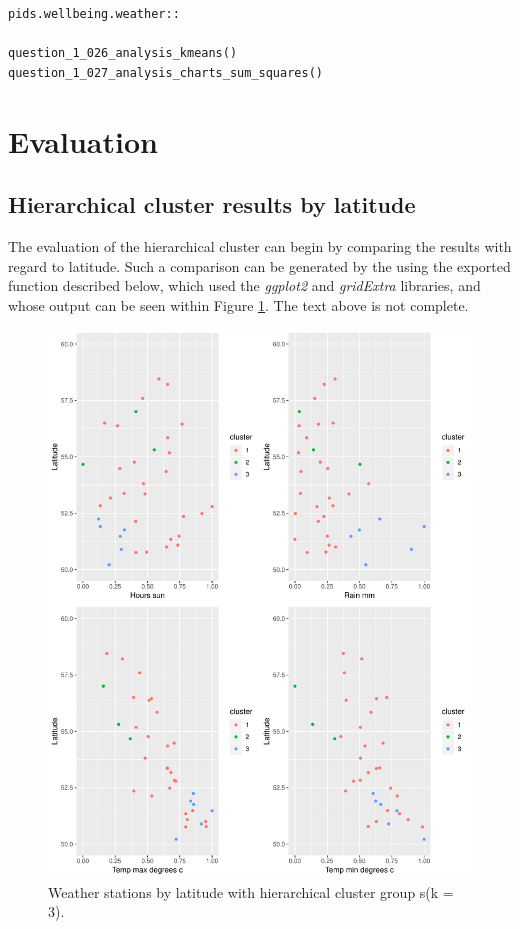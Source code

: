 \documentclass[12pt, oneside, openany]{book}
\begin{document}
\bigskip
\begin{lstlisting}
pids.wellbeing.weather::

question_1_026_analysis_kmeans()
question_1_027_analysis_charts_sum_squares()
\end{lstlisting}

\section*{Evaluation}

\subsection*{Hierarchical cluster results by latitude}
The evaluation of the hierarchical cluster can begin by comparing the results with regard to latitude. Such a comparison can be generated by the  using the exported function described below, which used the \emph{ggplot2} and \emph{gridExtra} libraries, and whose output can be seen within Figure \ref{fig:question_1_032_eval_charts_hierarchical_latitude}.
\color{red}The text above is not complete\color{black}.

\begin{figure}
	\centering
	\captionsetup{justification=centering}
	\includegraphics[scale=0.7]{question_1_032_eval_charts_hierarchical_latitude}
	\caption{Weather stations by latitude with hierarchical cluster group s(k = 3).}
	\label{fig:question_1_032_eval_charts_hierarchical_latitude}
\end{figure}
\end{document}

